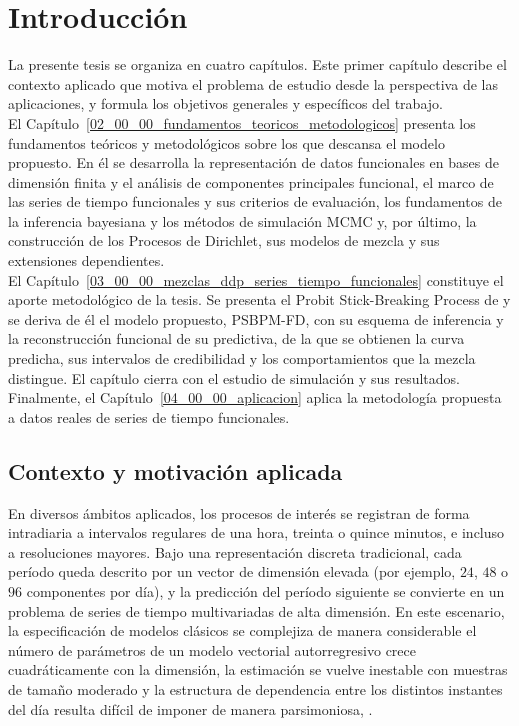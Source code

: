 \chapter{Introducción}
\label{01_00_00_introduccion}

La presente tesis se organiza en cuatro capítulos. Este primer capítulo describe el contexto aplicado que motiva el problema de estudio desde la perspectiva de las aplicaciones, y formula los objetivos generales y específicos del trabajo.\\

El Capítulo~\ref{02_00_00_fundamentos_teoricos_metodologicos} presenta los fundamentos teóricos y metodológicos sobre los que descansa el modelo propuesto. En él se desarrolla la representación de datos funcionales en bases de dimensión finita y el análisis de componentes principales funcional, el marco de las series de tiempo funcionales y sus criterios de evaluación, los fundamentos de la inferencia bayesiana y los métodos de simulación MCMC y, por último, la construcción de los Procesos de Dirichlet, sus modelos de mezcla y sus extensiones dependientes. \\

El Capítulo~\ref{03_00_00_mezclas_ddp_series_tiempo_funcionales} constituye el aporte metodológico de la tesis. Se presenta el Probit Stick-Breaking Process de \citet{03_02_chung2009nonparametric} y se deriva de él el modelo propuesto, PSBPM-FD, con su esquema de inferencia y la reconstrucción funcional de su predictiva, de la que se obtienen la curva predicha, sus intervalos de credibilidad y los comportamientos que la mezcla distingue. El capítulo cierra con el estudio de simulación y sus resultados.\\

Finalmente, el Capítulo~\ref{04_00_00_aplicacion} aplica la metodología propuesta a datos reales de series de tiempo funcionales.

\section{Contexto y motivación aplicada}
\label{01_01_00_contexto_motivacion_aplicada}
En diversos ámbitos aplicados, los procesos de interés se registran de forma intradiaria a intervalos regulares de una hora, treinta o quince minutos, e incluso a resoluciones mayores. Bajo una representación discreta tradicional, cada período queda descrito por un vector de dimensión elevada (por ejemplo, $24$, $48$ o $96$ componentes por día), y la predicción del período siguiente se convierte en un problema de series de tiempo multivariadas de alta dimensión. En este escenario, la especificación de modelos clásicos se complejiza de manera considerable el número de parámetros de un modelo vectorial autorregresivo crece cuadráticamente con la dimensión, la estimación se vuelve inestable con muestras de tamaño moderado y la estructura de dependencia entre los distintos instantes del día resulta difícil de imponer de manera parsimoniosa, 
\cite{02_02_aue2015prediction,02_01_kokoszka2017introduction,02_02_bosq2000linear}.\\


